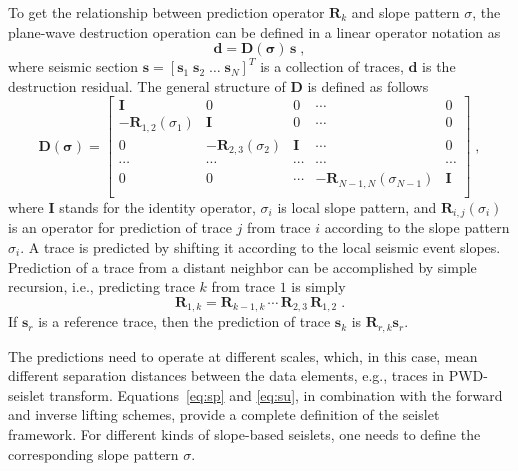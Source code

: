 To get the relationship between prediction operator
$\mathbf{R}_k$ and slope pattern $\sigma$, the plane-wave destruction 
operation \cite[]{Fomel02} can be defined in a linear operator notation as
\begin{equation}
  \label{eq:pwd}
  \mathbf{d} = \mathbf{D(\sigma)\,s}\;,
\end{equation}
where seismic section $\mathbf{s} = \left[\mathbf{s}_1 \; 
\mathbf{s}_2 \; \ldots \; \mathbf{s}_N\right]^T$ is a collection of traces, 
$\mathbf{d}$ is the destruction residual.  The general structure of $\mathbf{D}$ is
defined as follows \cite[]{Fomel06b,Fomel10b}
\begin{equation}
  \label{eq:d}
  \mathbf{D(\sigma)} =
  \left[\begin{array}{ccccc}
      \mathbf{I} & 0 & 0 & \cdots & 0 \\
      - \mathbf{R}_{1,2}(\sigma_1) & \mathbf{I} & 0 & \cdots & 0 \\
      0 & - \mathbf{R}_{2,3}(\sigma_2) & \mathbf{I} & \cdots & 0 \\
      \cdots & \cdots & \cdots & \cdots & \cdots \\
      0 & 0 & \cdots & - \mathbf{R}_{N-1,N}(\sigma_{N-1}) & \mathbf{I} \\
    \end{array}\right]\;,
\end{equation}
where $\mathbf{I}$ stands for the identity operator, $\sigma_i$ is
local slope pattern, and $\mathbf{R}_{i,j}(\sigma_i)$ is an operator
for prediction of trace $j$ from trace $i$ according to the slope
pattern $\sigma_i$. A trace is predicted by shifting it according to
the local seismic event slopes. Prediction of a trace
from a distant neighbor can be accomplished by simple recursion, i.e.,
predicting trace $k$ from trace $1$ is simply
\begin{equation}
  \label{eq:pred}
  \mathbf{R}_{1,k} = \mathbf{R}_{k-1,k}\,
  \cdots\,\mathbf{R}_{2,3}\,\mathbf{R}_{1,2}\;.
\end{equation}
If $\mathbf{s}_r$ is a reference trace, then the prediction of trace
$\mathbf{s}_k$ is $\mathbf{R}_{r,k} \mathbf{s}_r$.

The predictions need to operate at different scales, which, in this
case, mean different separation distances between the data elements,
e.g., traces in PWD-seislet transform. Equations~\ref{eq:sp} and
\ref{eq:su}, in combination with the forward and inverse lifting
schemes, provide a complete definition of the seislet framework. For
different kinds of slope-based seislets, one needs to define the
corresponding slope pattern $\sigma$.

